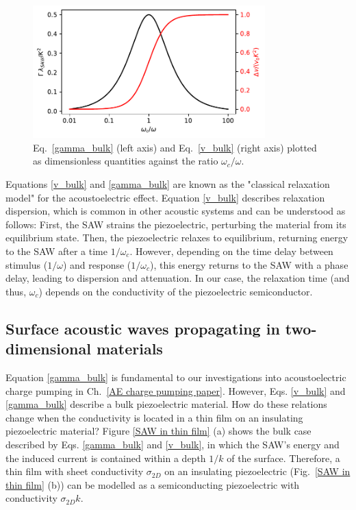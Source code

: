 \documentclass[double,12pt,1in,seploa]{beavtex}
\let\Oldsubsection\subsection
\renewcommand{\subsection}{\FloatBarrier\Oldsubsection}
\begin{document}
\begin{figure}
    \includegraphics[width=0.8\textwidth]{gamma_and_v.pdf}
    \caption{Eq.\ \ref{gamma_bulk} (left axis) and Eq.\ \ref{v_bulk} (right axis) plotted as dimensionless quantities against the ratio $\omega_c/\omega$.}
    \label{gamma_and_v}
\end{figure}
Equations \ref{v_bulk} and \ref{gamma_bulk} are known as the "classical relaxation model" for the acoustoelectric effect. Equation \ref{v_bulk} describes relaxation dispersion, which is common in other acoustic systems \cite{hutson_elastic_1962, rudenko_dispersive_2022} and can be understood as follows: First, the SAW strains the piezoelectric, perturbing the material from its equilibrium state. Then, the piezoelectric relaxes to equilibrium, returning energy to the SAW after a time $1/\omega_c$. However, depending on the time delay between stimulus ($1/\omega$) and response ($1/\omega_c$), this energy returns to the SAW with a phase delay, leading to dispersion and attenuation. In our case, the relaxation time (and thus, $\omega_c$) depends on the conductivity of the piezoelectric semiconductor. 

\subsection{Surface acoustic waves propagating in two-dimensional materials} \label{SAW theory, propagating in 2D materials}

Equation \ref{gamma_bulk} is fundamental to our investigations into acoustoelectric charge pumping in Ch.\ \ref{AE charge pumping paper}. However, Eqs. \ref{v_bulk} and \ref{gamma_bulk} describe a bulk piezoelectric material. How do these relations change when the conductivity is located in a thin film on an insulating piezoelectric material? Figure \ref{SAW in thin film} (a) shows the bulk case described by Eqs. \ref{gamma_bulk} and \ref{v_bulk}, in which the SAW's energy and the induced current is contained within a depth $1/k$ of the surface. Therefore, a thin film with sheet conductivity $\sigma_{2D}$ on an insulating piezoelectric (Fig.\ \ref{SAW in thin film} (b)) can be modelled as a semiconducting piezoelectric with conductivity $\sigma_{2D}k$.
\end{document}
